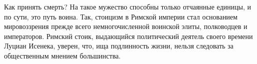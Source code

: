 Как принять смерть? На
такое мужество способны только отчаянные единицы, и по сути, это путь воина.
Так, стоицизм в Римской империи стал основанием мировоззрения прежде всего
немногочисленной воинской элиты, полководцев и императоров. 
Римский стоик,
выдающийся политический деятель своего времени Луциан Исенека, уверен, что, ища
подлинность жизни, нельзя следовать за общественным мнением большинства. 
